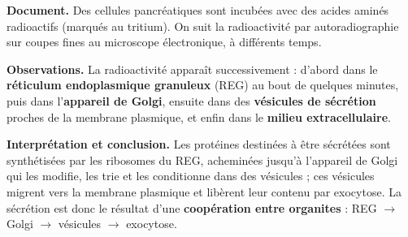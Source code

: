 \documentclass[11pt]{article}
\begin{document}
\begin{experience}
\textbf{Document.} Des cellules pancréatiques sont incubées avec des acides aminés radioactifs (marqués au tritium). On suit la radioactivité par autoradiographie sur coupes fines au microscope électronique, à différents temps.

\textbf{Observations.} La radioactivité apparaît successivement : d'abord dans le \textbf{réticulum endoplasmique granuleux} (REG) au bout de quelques minutes, puis dans l'\textbf{appareil de Golgi}, ensuite dans des \textbf{vésicules de sécrétion} proches de la membrane plasmique, et enfin dans le \textbf{milieu extracellulaire}.

\textbf{Interprétation et conclusion.} Les protéines destinées à être sécrétées sont synthétisées par les ribosomes du REG, acheminées jusqu'à l'appareil de Golgi qui les modifie, les trie et les conditionne dans des vésicules ; ces vésicules migrent vers la membrane plasmique et libèrent leur contenu par exocytose. La sécrétion est donc le résultat d'une \textbf{coopération entre organites} : REG $\rightarrow$ Golgi $\rightarrow$ vésicules $\rightarrow$ exocytose.
\end{experience}
\end{document}
